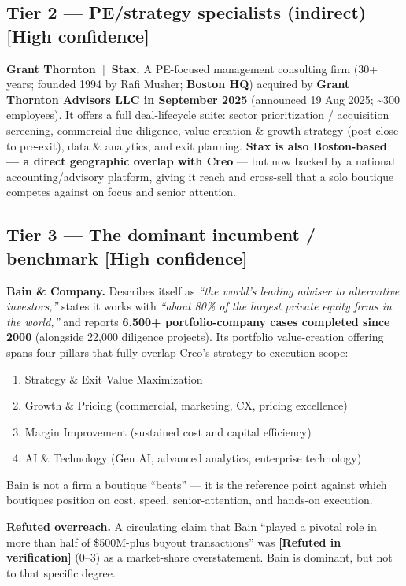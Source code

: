 \documentclass[11pt]{article}
\newcommand{\high}{\textcolor{green!45!black}{\textbf{[High confidence]}}}
\newcommand{\refuted}{\textcolor{red!75!black}{\textbf{[Refuted in verification]}}}
\begin{document}
\subsection{Tier 2 --- PE/strategy specialists (indirect) \high}

\textbf{Grant Thornton~$\vert$~Stax.} A PE-focused management consulting firm
(30+ years; founded 1994 by Rafi Musher; \textbf{Boston HQ}) acquired by
\textbf{Grant Thornton Advisors LLC in September 2025} (announced 19 Aug 2025;
\textasciitilde{}300 employees). It offers a full deal-lifecycle suite:
sector prioritization / acquisition screening, commercial due diligence,
value creation \& growth strategy (post-close to pre-exit), data \& analytics,
and exit planning. \textbf{Stax is also Boston-based --- a direct geographic
overlap with Creo} --- but now backed by a national accounting/advisory platform,
giving it reach and cross-sell that a solo boutique competes against on focus and
senior attention.

\subsection{Tier 3 --- The dominant incumbent / benchmark \high}

\textbf{Bain \& Company.} Describes itself as \emph{``the world's leading adviser
to alternative investors,''} states it works with \emph{``about 80\% of the
largest private equity firms in the world,''} and reports \textbf{6,500+
portfolio-company cases completed since 2000} (alongside 22,000 diligence
projects). Its portfolio value-creation offering spans four pillars that fully
overlap Creo's strategy-to-execution scope:

\begin{enumerate}
  \item Strategy \& Exit Value Maximization
  \item Growth \& Pricing (commercial, marketing, CX, pricing excellence)
  \item Margin Improvement (sustained cost and capital efficiency)
  \item AI \& Technology (Gen AI, advanced analytics, enterprise technology)
\end{enumerate}

Bain is not a firm a boutique ``beats'' --- it is the reference point against
which boutiques position on cost, speed, senior-attention, and
hands-on execution.

\begin{takeaway}
\textbf{Refuted overreach.} A circulating claim that Bain ``played a pivotal
role in more than half of \$500M-plus buyout transactions'' was \refuted{}
(0--3) as a market-share overstatement. Bain is dominant, but not to that
specific degree.
\end{takeaway}
\end{document}
